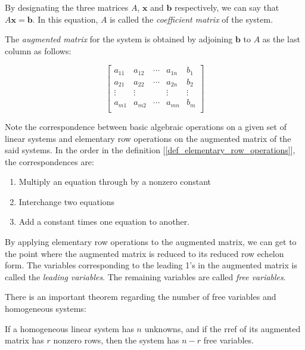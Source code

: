 \documentclass{report}
\begin{document}
		By designating the three matrices $A$, $\bm{x}$ and $\bm{b}$ respectively, we can say that $A\bm{x}=\bm{b}$. In this equation, $A$ is called the \emph{coefficient matrix} of the system.
		
		The \emph{augmented matrix} for the system is obtained by adjoining $\bm{b}$ to $A$ as the last column as follows:
		
		\begin{displaymath}
			\left[\begin{array}{cccc|c}
				a_{11} & a_{12} & \cdots & a_{1n} & b_1\\
				a_{21} & a_{22} & \cdots & a_{2n} & b_2\\
				\vdots & \vdots &        & \vdots & \vdots\\
				a_{m1} & a_{m2} & \cdots & a_{mn} & b_m\\
			\end{array}\right]
		\end{displaymath}
		
		Note the correspondence between basic algebraic operations on a given set of linear systems and elementary row operations on the augmented matrix of the said systems. In the order in the definition [\ref{def_elementary_row_operations}], the correspondences are:
		
		\begin{enumerate}
			\item Multiply an equation through by a nonzero constant
			\item Interchange two equations	
			\item Add a constant times one equation to another.
		\end{enumerate}
		
		By applying elementary row operations to the augmented matrix, we can get to the point where the augmented matrix is reduced to its reduced row echelon form. The variables corresponding to the leading 1's in the augmented matrix is called the \emph{leading variables}. The remaining variables are called \emph{free variables}.
		
		There is an important theorem regarding the number of free variables and homogeneous systems:
		
		\begin{thm}
			If a homogeneous linear system has $n$ unknowns, and if the rref of its augmented matrix has $r$ nonzero rows, then the system has $n-r$ free variables.
		\end{thm}
		
\end{document}
